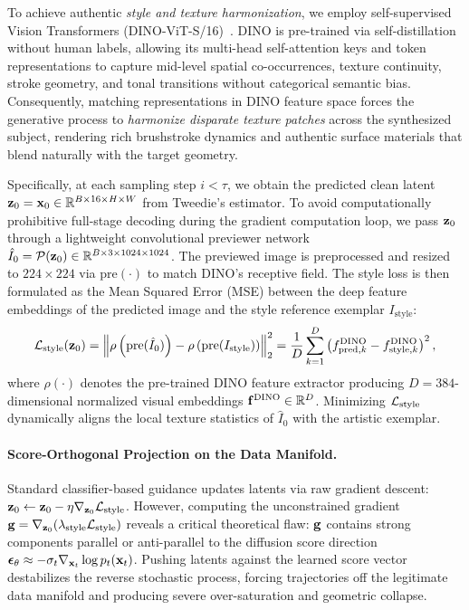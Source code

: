 To achieve authentic \textit{style and texture harmonization}, we employ self-supervised Vision Transformers (DINO-ViT-S/16)~\cite{dino}. DINO is pre-trained via self-distillation without human labels, allowing its multi-head self-attention keys and token representations to capture mid-level spatial co-occurrences, texture continuity, stroke geometry, and tonal transitions without categorical semantic bias. Consequently, matching representations in DINO feature space forces the generative process to \textit{harmonize disparate texture patches} across the synthesized subject, rendering rich brushstroke dynamics and authentic surface materials that blend naturally with the target geometry.

Specifically, at each sampling step $i < \tau$, we obtain the predicted clean latent $\mathbf{z}_0 = \mathbf{x}_0 \in \mathbb{R}^{B \times 16 \times H \times W}$ from Tweedie's estimator. To avoid computationally prohibitive full-stage decoding during the gradient computation loop, we pass $\mathbf{z}_0$ through a lightweight convolutional previewer network $\hat{I}_0 = \mathcal{P}(\mathbf{z}_0) \in \mathbb{R}^{B \times 3 \times 1024 \times 1024}$. The previewed image is preprocessed and resized to $224 \times 224$ via $\text{pre}(\cdot)$ to match DINO's receptive field. The style loss is then formulated as the Mean Squared Error (MSE) between the deep feature embeddings of the predicted image and the style reference exemplar $I_{\text{style}}$:
\begin{equation}
    \mathcal{L}_{\text{style}}(\mathbf{z}_0) = \left\lVert \rho\left( \text{pre}(\hat{I}_0) \right) - \rho\left( \text{pre}(I_{\text{style}}) \right) \right\rVert_2^2 = \frac{1}{D} \sum_{k=1}^D \left( f_{\text{pred}, k}^{\text{DINO}} - f_{\text{style}, k}^{\text{DINO}} \right)^2,
    \label{eq:dino_loss}
\end{equation}
where $\rho(\cdot)$ denotes the pre-trained DINO feature extractor producing $D = 384$-dimensional normalized visual embeddings $\mathbf{f}^{\text{DINO}} \in \mathbb{R}^D$. Minimizing $\mathcal{L}_{\text{style}}$ dynamically aligns the local texture statistics of $\hat{I}_0$ with the artistic exemplar.

\paragraph{Score-Orthogonal Projection on the Data Manifold.}
Standard classifier-based guidance updates latents via raw gradient descent: $\mathbf{z}_0 \leftarrow \mathbf{z}_0 - \eta \nabla_{\mathbf{z}_0} \mathcal{L}_{\text{style}}$. However, computing the unconstrained gradient $\mathbf{g} = \nabla_{\mathbf{z}_0} (\lambda_{\text{style}} \mathcal{L}_{\text{style}})$ reveals a critical theoretical flaw: $\mathbf{g}$ contains strong components parallel or anti-parallel to the diffusion score direction $\boldsymbol{\epsilon}_\theta \approx -\sigma_t \nabla_{\mathbf{x}_t} \log p_t(\mathbf{x}_t)$. Pushing latents against the learned score vector destabilizes the reverse stochastic process, forcing trajectories off the legitimate data manifold and producing severe over-saturation and geometric collapse.

